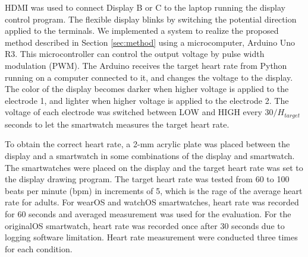 \documentclass[sigchi,authordraft]{acmart}
\begin{document}
HDMI was used to connect Display B or C to the laptop running the display control program. The flexible display blinks by switching the potential direction applied to the terminals. We implemented a system to realize the proposed method described in Section \ref{sec:method} using a microcomputer, Arduino Uno R3. This microcontroller can control the output voltage by pulse width modulation (PWM). %
The Arduino receives the target heart rate from Python running on a computer connected to it, and changes the voltage to the display. The color of the display becomes darker when higher voltage is applied to the electrode 1, and lighter when higher voltage is applied to the electrode 2. The voltage of each electrode was switched between LOW and HIGH every $30/H_{target}$ seconds to let the smartwatch measures the target heart rate.

To obtain the correct heart rate, a 2-mm acrylic plate was placed between the display and a smartwatch in some combinations of the display and smartwatch. The smartwatches were placed on the display and the target heart rate was set to the display drawing program. The target heart rate was tested from 60 to 100 beats per minute (bpm) in increments of 5, which is the rage of the average heart rate for adults\cite{average_heart_rate}. For wearOS and watchOS smartwatches, heart rate was recorded for 60 seconds and averaged measurement was used for the evaluation. For the originalOS smartwatch, heart rate was recorded once after 30 seconds due to logging software limitation. Heart rate measurement were conducted three times for each condition.
\end{document}

